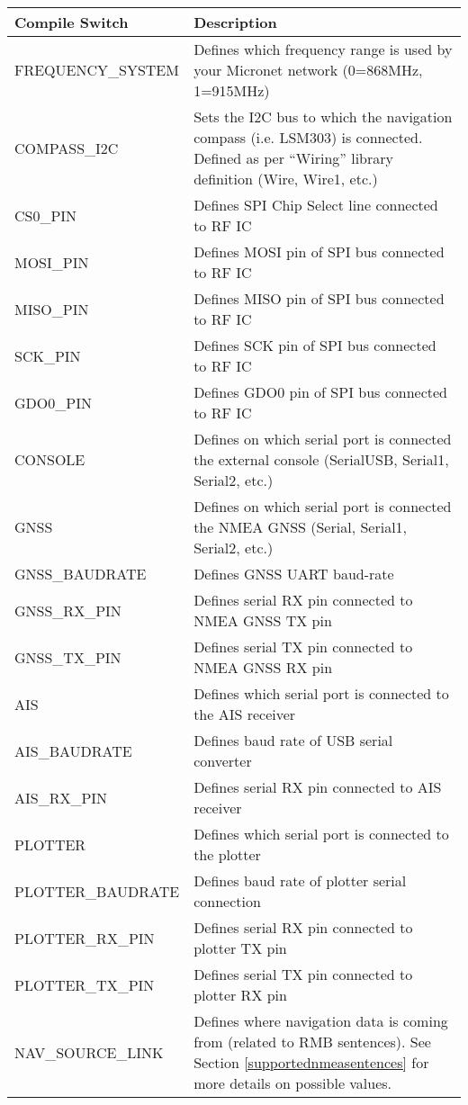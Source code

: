 \documentclass{report}
\begin{document}
	\begin{tabularx}{\linewidth}{@{}lX@{}}
		\hline
		\textbf{Compile Switch} & \textbf{Description}\\
		\hline
		FREQUENCY\_SYSTEM & Defines which frequency range is used by your Micronet network (0=868MHz, 1=915MHz)\\
		\hline
		COMPASS\_I2C & Sets the I2C bus to which the navigation compass (i.e. LSM303) is connected. Defined as per “Wiring” library definition (Wire, Wire1, etc.)\\
		\hline
		CS0\_PIN & Defines SPI Chip Select line connected to RF IC\\
		\hline
		MOSI\_PIN & Defines MOSI pin of SPI bus connected to RF IC\\
		\hline
		MISO\_PIN & Defines MISO pin of SPI bus connected to RF IC\\
		\hline
		SCK\_PIN & Defines SCK pin of SPI bus connected to RF IC\\
		\hline
		GDO0\_PIN & Defines GDO0 pin of SPI bus connected to RF IC\\
		\hline
		CONSOLE & Defines on which serial port is connected the external console (SerialUSB, Serial1, Serial2, etc.)\\
		\hline
		GNSS & Defines on which serial port is connected the NMEA GNSS (Serial, Serial1, Serial2, etc.)\\
		\hline
		GNSS\_BAUDRATE & Defines GNSS UART baud-rate\\
		\hline
		GNSS\_RX\_PIN & Defines serial RX pin connected to NMEA GNSS TX pin\\
		\hline
		GNSS\_TX\_PIN & Defines serial TX pin connected to NMEA GNSS RX pin\\
		\hline
		AIS & Defines which serial port is connected to the AIS receiver\\
		\hline
		AIS\_BAUDRATE & Defines baud rate of USB serial converter\\
		\hline
		AIS\_RX\_PIN & Defines serial RX pin connected to AIS receiver\\
		\hline
		PLOTTER & Defines which serial port is connected to the plotter\\
		\hline
		PLOTTER\_BAUDRATE & Defines baud rate of plotter serial connection\\
		\hline
		PLOTTER\_RX\_PIN & Defines serial RX pin connected to plotter TX pin\\
		\hline
		PLOTTER\_TX\_PIN & Defines serial TX pin connected to plotter RX pin\\
		\hline
		NAV\_SOURCE\_LINK & Defines where navigation data is coming from (related to RMB sentences). See Section {\ref{supportednmeasentences}} for more details on possible values.\\

\end{tabularx}
\end{document}
